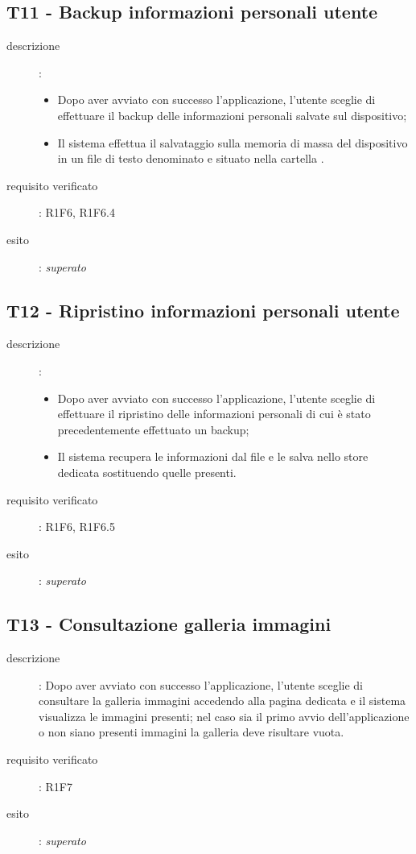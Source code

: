 \subsection{T11 - Backup informazioni personali utente}
\begin{description}
\item[descrizione]: \hfill
	\begin{itemize}
	\item Dopo aver avviato con successo l'applicazione, l'utente sceglie di effettuare il backup delle informazioni personali salvate sul dispositivo;
	\item Il sistema effettua il salvataggio sulla memoria di massa del dispositivo in un file di testo denominato  e situato nella cartella .
	\end{itemize}
\item[requisito verificato]: R1F6, R1F6.4
\item[esito]: \emph{superato}
\end{description}

\subsection{T12 - Ripristino informazioni personali utente}
\begin{description}
\item[descrizione]: \hfill
	\begin{itemize}
	\item Dopo aver avviato con successo l'applicazione, l'utente sceglie di effettuare il ripristino delle informazioni personali di cui è stato precedentemente effettuato un backup;
	\item Il sistema recupera le informazioni dal file  e le salva nello store dedicata sostituendo quelle presenti.
	\end{itemize}
\item[requisito verificato]: R1F6, R1F6.5
\item[esito]: \emph{superato}
\end{description}

\subsection{T13 - Consultazione galleria immagini}
\begin{description}
\item[descrizione]: Dopo aver avviato con successo l'applicazione, l'utente sceglie di consultare la galleria immagini accedendo alla pagina dedicata e il sistema visualizza le immagini presenti; nel caso sia il primo avvio dell'applicazione o non siano presenti immagini la galleria deve risultare vuota.
\item[requisito verificato]: R1F7
\item[esito]: \emph{superato}
\end{description}

